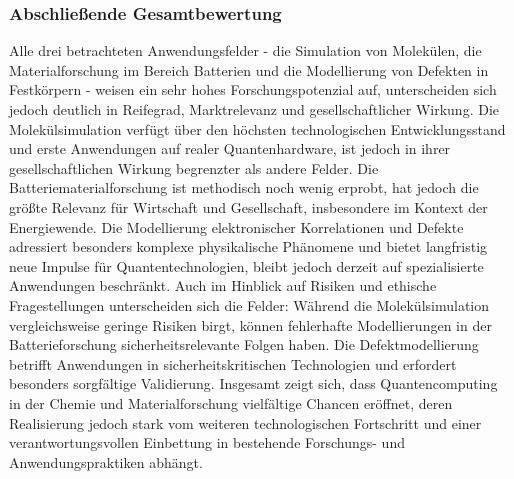 \subsubsection{Abschließende Gesamtbewertung}
Alle drei betrachteten Anwendungsfelder - die Simulation von Molekülen, die Materialforschung im Bereich Batterien und die Modellierung von Defekten in Festkörpern - weisen ein sehr hohes Forschungspotenzial auf, unterscheiden sich jedoch deutlich in Reifegrad, Marktrelevanz und gesellschaftlicher Wirkung. Die Molekülsimulation verfügt über den höchsten technologischen Entwicklungsstand und erste Anwendungen auf realer Quantenhardware, ist jedoch in ihrer gesellschaftlichen Wirkung begrenzter als andere Felder. Die Batteriematerialforschung ist methodisch noch wenig erprobt, hat jedoch die größte Relevanz für Wirtschaft und Gesellschaft, insbesondere im Kontext der Energiewende. Die Modellierung elektronischer Korrelationen und Defekte adressiert besonders komplexe physikalische Phänomene und bietet langfristig neue Impulse für Quantentechnologien, bleibt jedoch derzeit auf spezialisierte Anwendungen beschränkt. Auch im Hinblick auf Risiken und ethische Fragestellungen unterscheiden sich die Felder: Während die Molekülsimulation vergleichsweise geringe Risiken birgt, können fehlerhafte Modellierungen in der Batterieforschung sicherheitsrelevante Folgen haben. Die Defektmodellierung betrifft Anwendungen in sicherheitskritischen Technologien und erfordert besonders sorgfältige Validierung. Insgesamt zeigt sich, dass Quantencomputing in der Chemie und Materialforschung vielfältige Chancen eröffnet, deren Realisierung jedoch stark vom weiteren technologischen Fortschritt und einer verantwortungsvollen Einbettung in bestehende Forschungs- und Anwendungspraktiken abhängt.

\printbibliography
